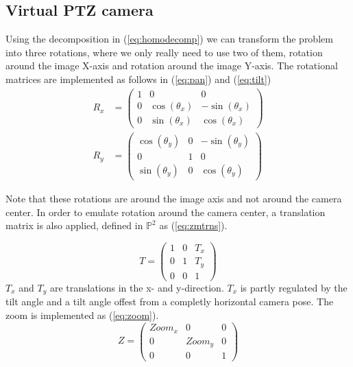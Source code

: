 \subsection{Virtual PTZ camera}
Using the decomposition in (\ref{eq:homodecomp}) we can transform the problem into three rotations, where we only really need to use two of them, rotation around the image X-axis and rotation around the image Y-axis.
The rotational matrices are implemented as follows in (\ref{eq:pan}) and (\ref{eq:tilt})
	\begin{align}
		R_x &=\begin{pmatrix}1 & 0 & 0 \\
			0 & \cos(\theta_x) & -\sin(\theta_x) \\
			0 & \sin(\theta_x) & \cos(\theta_x)
		\end{pmatrix} \label{eq:pan}\\
		R_y&=\begin{pmatrix} \cos(\theta_y) & 0 & -\sin(\theta_y) \\
			0 & 1 & 0 \\
			\sin(\theta_y) & 0 & \cos(\theta_y)
		\end{pmatrix} \label{eq:tilt}
	\end{align}

	Note that these rotations are around the image axis and not around the camera center.
        In order to emulate rotation around the camera center, a translation matrix is also applied, defined in $\mathbb{P}^2$ as (\ref{eq:zmtrns}).

	\begin{equation}
		T=\begin{pmatrix}
			1 & 0 & T_x \\
			0 & 1 & T_y \\
			0 & 0 & 1
		\end{pmatrix} \label{eq:zmtrns}
	\end{equation}
	$T_x$ and $T_y$ are translations in the x- and y-direction.
        $T_x$ is partly regulated by the tilt angle and a tilt angle offest from a completly horizontal camera pose.
	The zoom is implemented as (\ref{eq:zoom}).
	\begin{equation}
		Z=\begin{pmatrix}
			Zoom_x & 0 & 0\\
			0 & Zoom_y & 0\\
			0 & 0 & 1
		\end{pmatrix}
		\label{eq:zoom}
	\end{equation}

